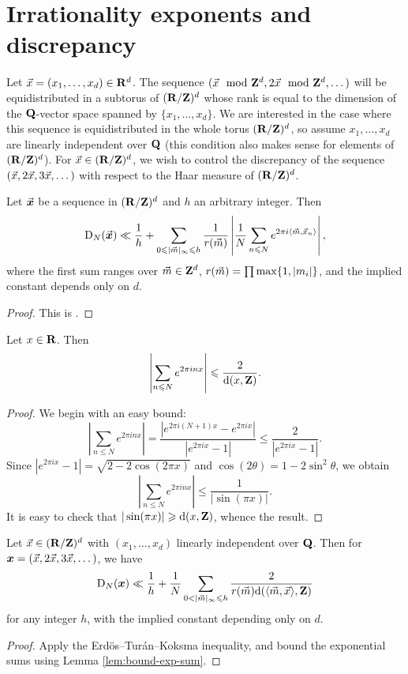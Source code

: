 \section{Irrationality exponents and discrepancy}

Let $\vec{x}=(x_1,\dots,x_d)\in \mathbf{R}^d$. The sequence 
$(\vec{x}\mod {\mathbf{Z}}^d,2\vec{x}\mod{\mathbf{Z}}^d,\dots)$ will be equidistributed in a subtorus of 
$(\mathbf{R}/\mathbf{Z})^d$ whose rank is equal to the dimension of the $\mathbf{Q}$-vector space 
spanned by $\{x_1,\dots,x_d\}$. We are interested in the case where this 
sequence is equidistributed in the whole torus $(\mathbf{R}/\mathbf{Z})^d$, so assume 
$x_1,\dots,x_d$ are linearly independent over $\mathbf{Q}$ (this condition also 
makes sense for elements of $(\mathbf{R}/\mathbf{Z})^d$). For $\vec{x}\in (\mathbf{R}/\mathbf{Z})^d$, we wish 
to control the discrepancy of the sequence $(\vec{x},2\vec{x},3\vec{x},\dots)$ with respect 
to the Haar measure of $(\mathbf{R}/\mathbf{Z})^d$. 

\begin{theorem}
Let $\vec{\boldsymbol x}$ be a sequence in $(\mathbf{R}/\mathbf{Z})^d$ and $h$ an arbitrary integer. Then 
\[
	\operatorname{D}_N(\vec{\boldsymbol x}) \ll \frac 1 h + \sum_{0\leqslant |\vec{m}|_\infty \leqslant h} \frac{1}{r(\vec{m})} \left| \frac 1 N \sum_{n\leqslant N} e^{2\pi i \langle \vec{m},\vec{x}_n\rangle}\right| ,
\]
where the first sum ranges over $\vec{m}\in \mathbf{Z}^d$, 
$r(\vec{m}) = \prod \max\{1,|m_i|\}$, and the implied constant depends only on $d$. 
\end{theorem}
\begin{proof}
This is \cite[Th.~1.21]{drmota-tichy-1997}. 
\end{proof}

\begin{lemma}\label{lem:bound-exp-sum}
Let $x\in \mathbf{R}$. Then 
\[
	\left| \sum_{n\leqslant N} e^{2\pi i n x}\right| \leqslant \frac{2}{\mathrm{d}(x, \mathbf{Z})} .
\]
\end{lemma}
\begin{proof}
We begin with an easy bound: 
\[
	\left| \sum_{n\leqslant N} e^{2\pi i n x}\right| = \frac{|e^{2\pi i (N+1) x} - e^{2\pi i x}|}{|e^{2\pi i x} - 1|} \leqslant \frac{2}{|e^{2\pi i x} - 1|} .
\]
Since $|e^{2\pi i x} - 1| = \sqrt{2-2\cos(2\pi x)}$ and 
$\cos(2\theta) = 1-2\sin^2\theta$, we obtain 
\[
	\left|\sum_{n\leqslant N} e^{2\pi i n x}\right| \leqslant \frac{1}{|\sin(\pi x)|} .
\]
It is easy to check that $|\sin(\pi x)| \geqslant \mathrm{d}(x,\mathbf{Z})$, whence the result.  
\end{proof}

\begin{corollary}\label{cor:bound-disc-distance}
Let $\vec{x}\in (\mathbf{R}/\mathbf{Z})^d$ with $(x_1,\dots,x_d)$ linearly independent over $\mathbf{Q}$. 
Then for ${\boldsymbol x}=(\vec{x},2\vec{x},3\vec{x},\dots)$, we have 
\[
	\D_N(\bx) \ll \frac 1 h + \frac 1 N \sum_{0<|\vm|_\infty \leqslant h} \frac{2}{r(\vm) \dd(\langle \vm,\vx\rangle,\bZ)} 
\]
for any integer $h$, with the implied constant depending only on $d$. 
\end{corollary}
\begin{proof}
Apply the Erd\"os--Tur\'an--Koksma inequality, and bound the exponential sums 
using Lemma \ref{lem:bound-exp-sum}. 
\end{proof}

